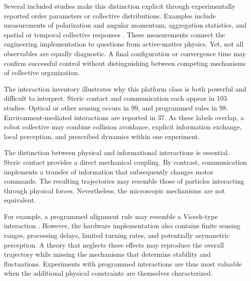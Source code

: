 Several included studies make this distinction explicit
through experimentally reported order parameters or
collective distributions. Examples include measurements
of polarization and angular momentum, aggregation
statistics, and spatial or temporal collective responses
\cite{Wu2024adversarialimitatio,Zhang2022collectivefissionb,Zhou2024anticipationpromote,Castro2025visualcollectivebe,Barone2024experimentalandnum,MarchPons2024honeybeelikecollec,Mijalkov2016engineeringsensoria,Li2022fieldmediatedlocom,Paramanick2025spontaneousemergenc}.
These measurements connect the engineering implementation
to questions from active-matter physics. Yet, not all
observables are equally diagnostic. A final configuration
or convergence time may confirm successful control
without distinguishing between competing mechanisms
of collective organization.

The interaction inventory illustrates why this platform
class is both powerful and difficult to interpret.
Steric contact and communication each appear in
103 studies. Optical or other sensing occurs in 99,
and programmed rules in 98. Environment-mediated
interactions are reported in 37. As these labels
overlap, a robot collective may combine collision
avoidance, explicit information exchange, local
perception, and prescribed dynamics within one
experiment.

The distinction between physical and informational
interactions is essential. Steric contact provides
a direct mechanical coupling. By contrast,
communication implements a transfer of information
that subsequently changes motor commands. The
resulting trajectories may resemble those of
particles interacting through physical forces.
Nevertheless, the microscopic mechanisms are
not equivalent.

For example, a programmed alignment rule may
resemble a Vicsek-type interaction
\cite{Vicsek1995novel}.
However, the hardware implementation also contains
finite sensing ranges, processing delays, limited
turning rates, and potentially asymmetric perception.
A theory that neglects these effects may reproduce
the overall trajectory while missing the mechanisms
that determine stability and fluctuations.
Experiments with programmed interactions are thus
most valuable when the additional physical
constraints are themselves characterized.

